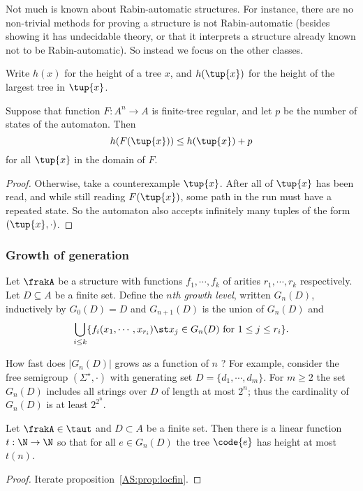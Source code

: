 Not much is known about Rabin-automatic structures. For instance, there are no non-trivial methods for proving a structure
is not Rabin-automatic (besides showing it has undecidable theory, or that it interprets a structure already known not to be
Rabin-automatic). So instead we focus on the other classes.

Write $h(x)$ for the height of a tree $x$, and $h(\tup{x})$ for the height of the largest tree in $\tup{x}$.

\begin{proposition} \label{AS:prop:locfin}
Suppose that function $F:A^n \to A$ is finite-tree regular, and let $p$ be the number of states of the automaton.
Then
$$h(F(\tup{x}))
\leq h(\tup{x}) + p
$$
for all $\tup{x}$ in the domain of $F$.
\end{proposition}

\begin{proof}
Otherwise, take a counterexample  $\tup{x}$.
After all of $\tup{x}$ has been read, and while still reading $F(\tup{x})$, some path in the run must have a repeated state. 
So the automaton also accepts infinitely many tuples of the form $(\tup{x}, \cdot)$.
\end{proof}

\subsubsection*{Growth of generation}

\begin{definition} \label{dfn:growth}
Let $\frakA$ be a structure with functions $f_1, \cdots, f_k$ of arities $r_1, \cdots, r_k$ respectively. 
Let $D \subseteq A$ be a finite set.
Define the
{\em $n$th growth level}, written $G_n(D)$, inductively by $G_0(D) = D$
and $G_{n+1}(D)$ is the union of $G_n(D)$ and
\[
\bigcup_{i\leq k} \{f_i(x_1,\cdots,x_{r_i}) \st x_j \in G_n(D) \text{ for } 1 \leq j \leq r_i\}.
\]
\end{definition}

How fast does $|G_n(D)|$ grows as a function of $n$ ?  For
example, consider the free semigroup $(\Sigma^{\star},\cdot)$ with generating
set $D = \{d_1, \cdots, d_m\}$. For $m \geq 2$ the set $G_n(D)$ includes all strings over $D$ of length
at most $2^n$; thus the cardinality of $G_n(D)$ is at least $2^{2^{n}}$.

\begin{proposition} %
 \label{prop:growth}
Let $\frakA \in \taut$ and $D \subset A$ be a finite set. Then there is a
linear function $t:\N \rightarrow \N$ so that for all $e \in G_n(D)$ the tree $\code{e}$ has
height at most $t(n)$.
\end{proposition}
\begin{proof}
 Iterate proposition~\ref{AS:prop:locfin}.
\end{proof}

